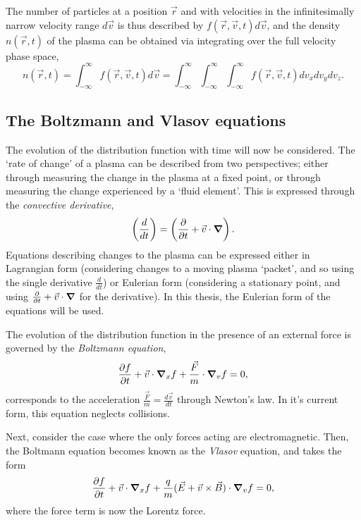 The number of particles at a position $\vec{r}$ and with velocities in the infinitesimally narrow velocity range $d\vec{v}$ is thus described by $f(\vec{r}, \vec{v}, t) d\vec{v}$, and the density $n(\vec{r},t)$ of the plasma can be obtained via integrating over the full velocity phase space,
\begin{equation} n(\vec{r}, t) = \int^{\infty}_{-\infty} f(\vec{r}, \vec{v}, t) d\vec{v}  = \int^{\infty}_{-\infty} \int^{\infty}_{-\infty} \int^{\infty}_{-\infty} f(\vec{r}, \vec{v}, t) dv_x dv_y dv_z. \end{equation}


\subsection{The Boltzmann and Vlasov equations} \label{BoltzmannSection}

The evolution of the distribution function with time will now be considered. The `rate of change' of a plasma can be described from two perspectives; either through measuring the change in the plasma at a fixed point, or through measuring the change experienced by a `fluid element'. This is expressed through the \textit{convective derivative}, 
\begin{equation} \left(\frac{d}{dt}\right) = \left(\frac{\partial}{\partial t} + \vec{v} \cdot \grad\right). \end{equation}
Equations describing changes to the plasma can be expressed either in Lagrangian form (considering changes to a moving plasma `packet', and so using the single derivative $\frac{d}{dt}$) or Eulerian form (considering a stationary point, and using $\frac{\partial}{\partial t} + \vec{v} \cdot \grad$ for the derivative). In this thesis, the Eulerian form of the equations will be used.

The evolution of the distribution function in the presence of an external force is governed by the \textit{Boltzmann equation},
\begin{equation} \frac{\partial f}{\partial t} + \vec{v}\cdot \grad_x f + \frac{\vec{F}}{m} \cdot \grad_v f = 0, \end{equation}
corresponds to the acceleration $\frac{\vec{F}}{m} = \frac{d\vec{v}}{dt}$ through Newton's law. In it's current form, this equation neglects collisions.

Next, consider the case where the only forces acting are electromagnetic. Then, the Boltmann equation becomes known as the \textit{Vlasov} equation, and takes the form
\begin{equation} \frac{\partial f}{\partial t} + \vec{v}\cdot \grad_x f + \frac{q}{m}(\vec{E} + \vec{v}\times\vec{B}) \cdot \grad_v f = 0, \end{equation}
where the force term is now the Lorentz force.

